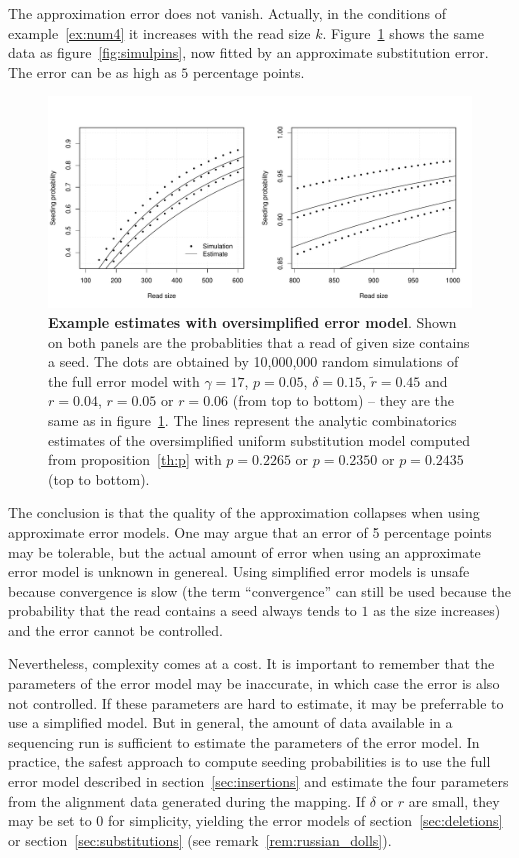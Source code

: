 \documentclass{article}
\begin{document}
The approximation error does not vanish. Actually, in the
conditions of example~\ref{ex:num4} it increases with the read size $k$.
Figure~\ref{fig:simulp_approx} shows the same data as
figure~\ref{fig:simulpins}, now fitted by an approximate substitution
error. The error can be as high as $5$ percentage points.


\begin{figure}[h]
\centering
\includegraphics[scale=0.445]{simulp_approx.pdf}
\caption{\textbf{Example estimates with oversimplified error model}.
Shown on both panels are the probablities that a read of given size
contains a seed. The dots are obtained by 10,000,000 random simulations of
the full error model with $\gamma=17$, $p=0.05$, $\delta=0.15$, $\tilde{r}
= 0.45$ and $r=0.04$, $r=0.05$ or $r=0.06$ (from top to bottom) -- they
are the same as in figure~\ref{fig:simulp_approx}. The lines represent the
analytic combinatorics estimates of the oversimplified uniform
substitution model computed from proposition~\ref{th:p} with $p=0.2265$ or
$p=0.2350$ or $p=0.2435$ (top to bottom).}
\label{fig:simulp_approx}
\end{figure}

The conclusion is that the quality of the approximation collapses when
using approximate error models. One may argue that an error of 5
percentage points may be tolerable, but the actual amount of error when
using an approximate error model is unknown in genereal. Using simplified
error models is unsafe because convergence is slow (the term
``convergence'' can still be used because the probability that
the read contains a seed always tends to $1$ as the size increases) and
the error cannot be controlled.

Nevertheless, complexity comes at a cost. It is important to remember that
the parameters of the error model may be inaccurate, in which case the
error is also not controlled. If these parameters are hard to estimate, it
may be preferrable to use a simplified model. But in general, the amount
of data available in a sequencing run is sufficient to estimate the
parameters of the error model. In practice, the safest approach to compute
seeding probabilities is to use the full error model described in
section~\ref{sec:insertions} and estimate the four parameters from the
alignment data generated during the mapping. If $\delta$ or $r$
are small, they may be set to $0$ for simplicity, yielding the error
models of section~\ref{sec:deletions} or section~\ref{sec:substitutions}
(see remark~\ref{rem:russian_dolls}).
\end{document}
